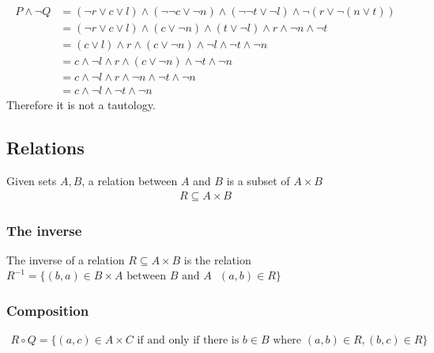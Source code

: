 \documentclass[a4paper]{article}
\theoremstyle{plain}
\theoremstyle{definition}
\newtheorem{defn}{Definition}[section]
\newtheorem{exmp}{Example}[section]
\theoremstyle{remark}
\begin{document}
\begin{tcolorbox}[colback=black!3!white,colframe=black!60!white,title=\begin{exmp}Riemann Hypothesis Statement \label{Riemann Hypothesis Statement}\end{exmp}]
\begin{align*}
			P \land \neg Q &= (\neg r \lor c \lor l) \land (\neg \neg c \lor \neg n) \land (\neg \neg t \lor \neg l) \land \neg (r \lor \neg ( n \lor t))\\
				       &= (\neg r \lor c \lor l) \land (c \lor \neg n) \land (t \lor \neg l) \land r \land \neg n \land \neg t \\
				       &= (c \lor l) \land r \land (c \lor \neg n) \land \neg l \land \neg t \land \neg n \\
				       &= c\land \neg l \land r \land (c \lor \neg n) \land \neg t \land \neg n \\
				       &= c \land \neg l \land r \land \neg n \land \neg t \land \neg n \\
				       & = c \land \neg l \land \neg t \land \neg n
		\end{align*}
		Therefore it is not a tautology.
\end{tcolorbox}
\subsection{Relations}
\begin{tcolorbox}[colback=black!3!white,colframe=black!60!white,title=\begin{defn}Relation \label{Relation}\end{defn}]
Given sets $A,B$, a relation between $A$ and $B$ is a subset of $A \times B$
\begin{align}
	R \subseteq A \times B
\end{align}
\end{tcolorbox}

\subsubsection{The inverse}
\begin{tcolorbox}[colback=black!3!white,colframe=black!60!white,title=\begin{defn}Inverse of a relation \label{Inverse of a relation}\end{defn}]
The inverse of a relation $R \subseteq A \times B$ is the relation $R^{-1}=\{(b,a) \in B \times  A \text{ between $B$ and $A $ } (a,b) \in R \}$

\end{tcolorbox}

\subsubsection{Composition}
\begin{tcolorbox}[colback=black!3!white,colframe=black!60!white,title=\begin{defn}Composition of sets \label{Composition of sets}\end{defn}]
\begin{align}
	R \circ Q = \{ (a,c) \in A \times C \text{ if and only if there is } b \in B \text{ where } (a,b) \in R, (b,c) \in R\}
\end{align}
\end{tcolorbox}
\end{document}
